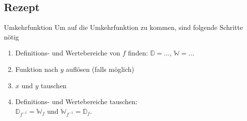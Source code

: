 \subsection{Rezept}
\begin{rezept}{Umkehrfunktion}{}
  Um auf die Umkehrfunktion zu kommen, sind folgende Schritte nötig
  \begin{enumerate}
  \item Definitions- und Wertebereiche von $f$ finden: $\mathbb{D} =
    ...$, $\mathbb{W} = ...$
  \item Funktion nach $y$ auf\/lösen (falls möglich)
  \item $x$ und $y$ tauschen
  \item Definitions- und Wertebereiche tauschen:\\
    $\mathbb{D}_{f^{-1}} = \mathbb{W}_f$ und  
    $\mathbb{W}_{f^{-1}} = \mathbb{D}_f$.
    \end{enumerate} 
  \end{rezept}
\newpage%
